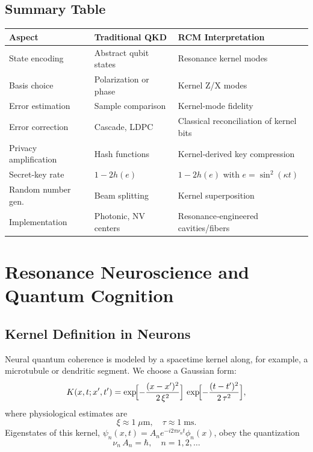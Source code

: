 \subsection{Summary Table}

\begin{center}
\begin{tabular}{l|l|l}
\bf Aspect & \bf Traditional QKD & \bf RCM Interpretation \\ \hline
State encoding        & Abstract qubit states  
                      & Resonance kernel modes \\[4pt]
Basis choice          & Polarization or phase  
                      & Kernel Z/X modes \\[4pt]
Error estimation      & Sample comparison  
                      & Kernel‐mode fidelity \\[4pt]
Error correction      & Cascade, LDPC  
                      & Classical reconciliation of kernel bits \\[4pt]
Privacy amplification & Hash functions  
                      & Kernel‐derived key compression \\[4pt]
Secret‐key rate       & $1-2h(e)$  
                      & $1-2h(e)$ with $e=\sin^2(\kappa t)$ \\[4pt]
Random number gen.    & Beam splitting  
                      & Kernel superposition \\[4pt]
Implementation        & Photonic, NV centers  
                      & Resonance‐engineered cavities/fibers 
\end{tabular}
\end{center}

\section{Resonance Neuroscience and Quantum Cognition}

\subsection{Kernel Definition in Neurons}

Neural quantum coherence is modeled by a spacetime kernel along, for example, a microtubule or dendritic segment.  We choose a Gaussian form:
\begin{equation}\label{eq:neural_kernel}
K(x,t; x',t')
= \exp\!\Bigl[-\frac{(x - x')^2}{2\,\xi^2}\Bigr]\,
  \exp\!\Bigl[-\frac{(t - t')^2}{2\,\tau^2}\Bigr],
\end{equation}
where physiological estimates are
\[
\xi \approx 1\;\mu\text{m},
\quad
\tau \approx 1\;\text{ms}.
\]
Eigenstates of this kernel,
\(\psi_n(x,t)=A_n e^{-i2\pi\nu_n t}\phi_n(x)\),
obey the quantization
\begin{equation}\label{eq:neural_quant}
\nu_n\,A_n = \hbar,
\quad n=1,2,\dots
\end{equation}

